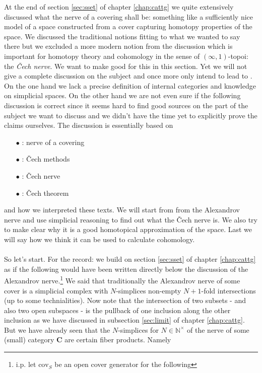 At the end of section \ref{sec:sset} of chapter \ref{chap:cattg} we quite extensively discussed what the nerve of a covering shall be: something like a sufficiently nice model of a space constructed from a cover capturing homotopy properties of the space. We discussed the traditional notions fitting to what we wanted to say there but we excluded a more modern notion from the discussion which is important for homotopy theory and cohomology in the sense of $(\infty,1)$-topoi: the \textit{\v{C}ech nerve}. We want to make good for this in this section. Yet we will not give a complete discussion on the subject and once more only intend to lead to \cite{a565d200}. On the one hand we lack a precise definition of internal categories and knowledge on simplicial spaces. On the other hand we are not even sure if the following discussion is correct since it seems hard to find good sources on the part of the subject we want to discuss and we didn't have the time yet to explicitly prove the claims ourselves. The discussion is essentially based on
\begin{enumerate}
\item[$\bullet$]
\cite{wiki-pedia0en}: nerve of a covering
\item[$\bullet$]
\cite{wiki-nlab0000}: \v{C}ech methods
\item[$\bullet$]
\cite{wiki-nlab0000}: \v{C}ech nerve
\item[$\bullet$]
\cite{wiki-nlab0000}: \v{C}ech theorem
\end{enumerate}
and how we interpreted these texts. We will start from from the Alexandrov nerve and use {\glqq}simplicial{\grqq} reasoning to find out what the \v{C}ech nerve is. We also try to make clear why it is a good homotopical approximation of the space. Last we will say how we think it can be used to {\glqq}calculate{\grqq} cohomology.
\\\\
So let's start. For the record: we build on section \ref{sec:sset} of chapter \ref{chap:cattg} as if the following would have been written directly below the discussion of the Alexandrov nerve.\footnote{i.p. let $\mathrm{cov}_{S}$ be an open cover generator for the following} We said that traditionally the Alexandrov nerve of some cover is a simplicial complex with $N$-simplices non-empty $N + 1$-fold intersections (up to some technialities). Now note that the intersection of two subsets - and also two open subspaces - is the pullback of one inclusion along the other inclusion as we have discussed in subsection \ref{sec:limit} of chapter \ref{chap:cattg}. But we have already seen that the $N$-simplices for $N \in \mathbb{N}^{\times}$ of the nerve of some (small) category $\mathbf{C}$ are certain fiber products. Namely
